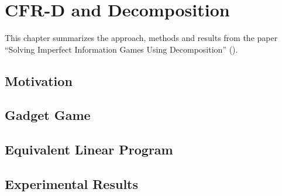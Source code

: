 \chapter{CFR-D and Decomposition}
\label{ch:cfr-d}
This chapter summarizes the approach, methods and results from the paper ``Solving Imperfect Information Games Using Decomposition'' (\cite{BurchJohansonBowling13}).

\section{Motivation}

\section{Gadget Game}

\section{Equivalent Linear Program}

\section{Experimental Results}
